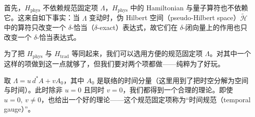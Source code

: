 首先，$H_{\mathrm{phys}}$ 不依赖规范固定项 $\Lambda$，$H_{\mathrm{phys}}$ 中的 Hamiltonian 与量子算符也不依赖它。这来自如下事实：当 $\Lambda$ 变动时，伪 Hilbert 空间（pseudo-Hilbert space）$\widetilde{\mathcal{H}}$ 中的算符只改变一个 $\delta$-恰当（$\delta$-exact）表达式，故它们在 $\delta$-闭向量上的作用也只改变一个 $\delta$-恰当表达式。

为了把 $H_{\mathrm{phys}}$ 与 $H_{\mathrm{trad}}$ 等同起来，我们可以选用方便的规范固定项 $\Lambda$。对其中一个这样的项做到这一点就够了，但我们要对两个项都做——纯粹为了好玩。

取 $\Lambda=u\,d^*A+vA_0$，其中 $A_0$ 是联络的时间分量（这里用到了把时空分解为空间与时间）。此时除非 $u=0$ 且同时 $v=0$，我们都得到一个合理的理论。即使 $u=0,\ v\neq0$，也给出一个好的理论——这个规范固定项称为“时间规范（temporal gauge）”。

